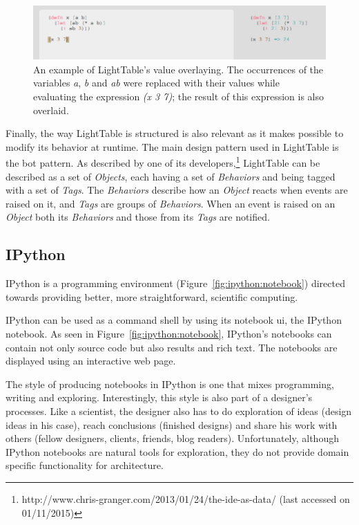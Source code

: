 \begin{figure}
	\centering
	\includegraphics[width=12cm]{./images/lt_val_overlay__inv}
	\caption{An example of LightTable's value overlaying. The occurrences of the variables \emph{a}, \emph{b} and \emph{ab} were replaced with their values while evaluating the expression \emph{(x 3 7)}; the result of this expression is also overlaid.}
	\label{fig:lt:val:overlay}
\end{figure}

Finally, the way LightTable is structured is also relevant as it makes possible to modify its behavior at runtime.
The main design pattern used in LightTable is the \gls{bot} pattern. %
As described by one of its developers,\footnote{http://www.chris-granger.com/2013/01/24/the-ide-as-data/ (last accessed on 01/11/2015)} LightTable can be described as a set of \emph{Objects}, each having a set of \emph{Behaviors} and being tagged with a set of \emph{Tags}.
The \emph{Behaviors} describe how an \emph{Object} reacts when events are raised on it, and \emph{Tags} are groups of \emph{Behaviors}.
When an event is raised on an \emph{Object} both its \emph{Behaviors} and those from its \emph{Tags} are notified.


\subsection{IPython}
\label{section:ipython:related}
IPython\cite{PER-GRA:2007} is a programming environment (Figure~\ref{fig:ipython:notebook}) directed towards providing better, more straightforward, scientific computing.

IPython can be used as a command shell by using its notebook \gls{ui}, the IPython notebook.
As seen in Figure~\ref{fig:ipython:notebook}, IPython's notebooks can contain not only source code but also results and rich text.
The notebooks are displayed using an interactive web page.

The style of producing notebooks in IPython is one that mixes programming, writing and exploring.
Interestingly, this style is also part of a designer's processes.
Like a scientist, the designer also has to do exploration of ideas (design ideas in his case), reach conclusions (finished designs) and share his work with others (fellow designers, clients, friends, blog readers).
Unfortunately, although IPython notebooks are natural tools for exploration, they do not provide domain specific functionality for architecture.

